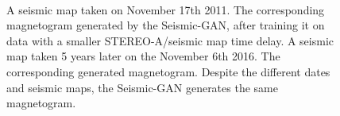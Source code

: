 \documentclass[11pt,a4paper,onecolumn]{report}
\begin{document}
\begin{figure}[t]%
  \centering
   \\
  \caption[]{ A seismic map taken on November 17th
  2011.  The corresponding magnetogram generated by the Seismic-GAN, after training
  it on data with a smaller STEREO-A/seismic map time delay.  A seismic map
  taken 5 years later on the November 6th 2016.  The corresponding generated magnetogram.
  Despite the different dates and seismic maps, the Seismic-GAN generates the
  same magnetogram.}
  \label{fig:mode_collapse}
\end{figure}
\end{document}
